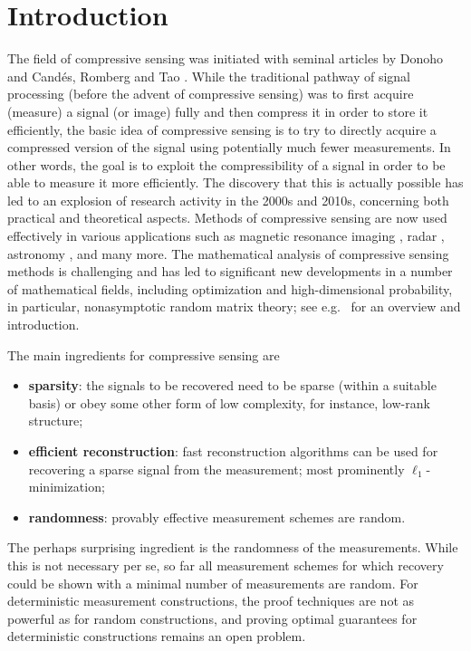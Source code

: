 \documentclass{svproc}
\newcommand{\corr}[1]{#1}
\newcommand{\0}{\boldsymbol{0}}
\newcommand{\1}{\boldsymbol{1}}
\begin{document}
\section{Introduction}
\label{sec:Introduction}

The field of compressive sensing was initiated
with seminal articles by Donoho \cite{donoho2006} and Cand{\'e}s, Romberg and Tao \cite{carota06}. While the traditional pathway of signal processing (before the advent of compressive sensing) was to first acquire (measure) a signal (or image) fully and then compress it in order to store it efficiently, the basic idea of compressive sensing is to try to directly acquire a compressed version of the signal using potentially much fewer measurements. In other words, the goal is to exploit the compressibility of a signal in order to be able to measure it more efficiently.
The discovery that this is actually possible has \corr{led} to an explosion of research \corr{activity} in the 2000s and 2010s, \corr{concerning} both practical and theoretical aspects. \corr{Methods} of compressive sensing are \corr{now} used effectively in various applications such as magnetic resonance imaging \cite{lustig2007sparse,hammernik2018}, radar \cite{herman2009high,ender2010compressive,Baidoo2021,dora17}, astronomy \cite{Wiaux2009,starck2010sparse,carillo2014}\corr{,} and many more. The mathematical analysis of compressive sensing methods is challenging and has \corr{led} to significant new developments in a number of mathematical fields\corr{,} including optimization and high-dimensional probability, in particular, nonasymptotic random matrix theory\corr{;} see e.g.\ \cite{foucart2013mathematical} for an overview and introduction.

The main ingredients for compressive sensing are \begin{itemize}
    \item \textbf{sparsity}: the signals to be recovered need to be sparse (within a suitable basis) or obey some other form of low complexity, for instance, \corr{low-rank structure};
    \item \textbf{efficient reconstruction}: fast reconstruction algorithms can be used for recovering a sparse signal from the measurement; most prominently $\ell_1$-minimization;
    \item \textbf{randomness}: provably effective measurement schemes are random.
\end{itemize}
The perhaps surprising ingredient is \corr{the} randomness of the measurements. While this is not necessary per se, so far all measurement schemes for which recovery could be shown with a minimal number of measurements are random. For deterministic measurement constructions, the proof techniques are not as powerful as for random constructions, and \corr{proving} optimal guarantees for deterministic constructions \corr{remains an open problem}.
\end{document}
